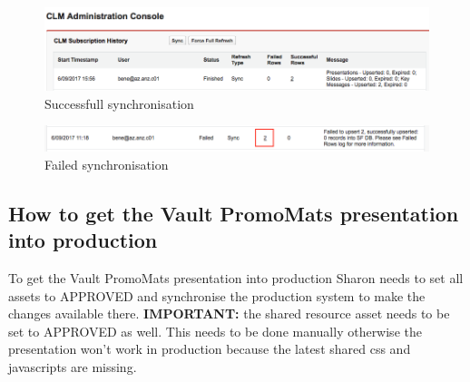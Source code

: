 \begin{center}
\begin{figure}[!htb]
\centering\includegraphics[width=\textwidth]{images/finished.png} 
\caption{Successfull synchronisation} \label{fig:finished}
\end{figure}
\end{center}

\begin{center}
\begin{figure}[!htb]
\centering\includegraphics[width=\textwidth]{images/failed.png} 
\caption{Failed synchronisation} \label{fig:failed}
\end{figure}
\end{center}



\subsection{How to get the Vault PromoMats presentation into production}
To get the Vault PromoMats presentation into production Sharon needs to set all assets to APPROVED and synchronise the production system to make the changes available there. {{\bfseries IMPORTANT:}} the shared resource asset needs to be set to APPROVED as well. This needs to be done manually otherwise the presentation won't work in production because the latest shared css and javascripts are missing.